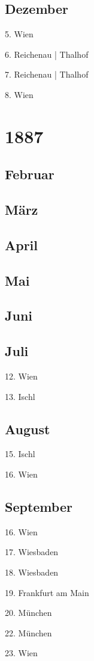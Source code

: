 \documentclass[twoside=false,titlepage=false,open=any, parskip=never, fontsize=10pt, headings=small, chapterprefix=false, appendixprefix=false, DIV=15]{scrbook}
\begin{document}
\begin{multicols}{3}
            \section*{Dezember}
            5. Wien\par
            6. Reichenau | Thalhof\par
            7. Reichenau | Thalhof\par
            8. Wien\par
            \chapter*{1887}
            \section*{Februar}
            \section*{März}
            \section*{April}
            \section*{Mai}
            \section*{Juni}
            \section*{Juli}
            12. Wien\par
            13. Ischl\par
            \section*{August}
            15. Ischl\par
            16. Wien\par
            \section*{September}
            16. Wien\par
            17. Wiesbaden\par
            18. Wiesbaden\par
            19. Frankfurt am Main\par
            20. München\par
            22. München\par
            23. Wien\par

\end{multicols}
\end{document}
